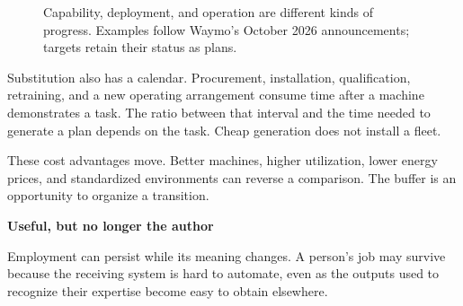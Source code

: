 \documentclass[11pt,openany]{book}
\newcommand{\subhead}[1]{\par\medskip\noindent\textbf{#1}\par\nobreak\smallskip}
\begin{document}
\begin{figure}[ht]
\centering
{}
\caption{Capability, deployment, and operation are different kinds of progress. Examples follow Waymo's October 2026 announcements; targets retain their status as plans.}
\label{fig:deployment-stages}
\end{figure}


Substitution also has a calendar. Procurement, installation, qualification, retraining, and a new operating arrangement consume time after a machine demonstrates a task. The ratio between that interval and the time needed to generate a plan depends on the task. Cheap generation does not install a fleet.

These cost advantages move. Better machines, higher utilization, lower energy prices, and standardized environments can reverse a comparison. The buffer is an opportunity to organize a transition.

\subhead{Useful, but no longer the author}

Employment can persist while its meaning changes. A person's job may survive because the receiving system is hard to automate, even as the outputs used to recognize their expertise become easy to obtain elsewhere.
\end{document}
